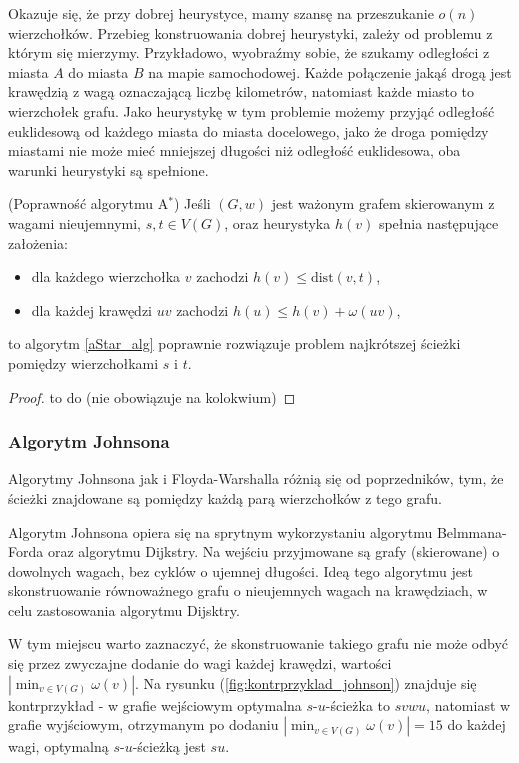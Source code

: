 Okazuje się, że przy dobrej heurystyce, mamy szansę na 
przeszukanie $o(n)$ wierzchołków. Przebieg konstruowania
dobrej heurystyki, zależy od problemu z którym się mierzymy. 
Przykładowo, wyobraźmy sobie, że szukamy odległości z miasta $A$
do miasta $B$ na mapie samochodowej. Każde połączenie jakąś drogą
jest krawędzią z wagą oznaczającą liczbę kilometrów, natomiast
każde miasto to wierzchołek grafu. Jako heurystykę w tym problemie 
możemy przyjąć odległość euklidesową od każdego miasta
do miasta docelowego, jako że droga pomiędzy miastami nie może mieć 
mniejszej długości niż odległość euklidesowa, oba warunki
heurystyki są spełnione.

\begin{theorem}
	(Poprawność algorytmu A$^*$) Jeśli
	$(G, w)$ jest ważonym grafem skierowanym
	z wagami nieujemnymi,
	$s,t \in V(G)$, oraz heurystyka $h(v)$
	spełnia następujące założenia:
	\begin{itemize}
		\item dla każdego wierzchołka $v$ zachodzi $h(v) \leq \text{dist}(v, t)$,
		\item dla każdej krawędzi $uv$ zachodzi $h(u) \leq h(v) + \omega(uv)$,
	\end{itemize}
	to algorytm \ref{aStar_alg}
	poprawnie rozwiązuje problem najkrótszej ścieżki
	pomiędzy wierzchołkami $s$ i $t$.
	\begin{proof}
		to do (nie obowiązuje na kolokwium)
	\end{proof}
	\label{aStar_proof}
\end{theorem}

\subsubsection{Algorytm Johnsona}
Algorytmy Johnsona jak i Floyda-Warshalla 
różnią się od poprzedników, tym, że
ścieżki znajdowane są pomiędzy każdą parą
wierzchołków z tego grafu.

Algorytm Johnsona opiera się na sprytnym wykorzystaniu
algorytmu Belmmana-Forda oraz algorytmu Dijkstry. Na 
wejściu przyjmowane są grafy (skierowane) o dowolnych
wagach, bez cyklów o ujemnej długości. Ideą tego
algorytmu jest skonstruowanie równoważnego 
grafu o nieujemnych wagach na krawędziach,
w celu zastosowania algorytmu Dijsktry.

W tym miejscu warto zaznaczyć, że skonstruowanie takiego
grafu nie może odbyć się przez zwyczajne dodanie
do wagi każdej krawędzi, wartości $|\min_{v \in V(G)}{\omega(v)}|$. 
Na rysunku (\ref{fig:kontrprzyklad_johnson})
znajduje się kontrprzykład - w grafie wejściowym
optymalna $s$-$u$-ścieżka to $svwu$, natomiast
w grafie wyjściowym, otrzymanym po dodaniu
$|\min_{v \in V(G)}{\omega(v)}| = 15$ do każdej 
wagi, optymalną $s$-$u$-ścieżką jest $su$.

